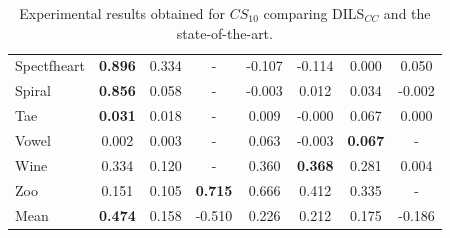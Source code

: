 \documentclass[review]{elsarticle}
\begin{document}
\begin{table}[!h]
{\begin{tabular}{lccccccc}
			Spectfheart & \textbf{0.896} & 0.334 & - & -0.107 & -0.114 & 0.000 & 0.050 \\
			Spiral & \textbf{0.856} & 0.058 & - & -0.003 & 0.012 & 0.034 & -0.002 \\
			Tae & \textbf{0.031} & 0.018 & - & 0.009 & -0.000 & 0.067 & 0.000 \\
			Vowel & 0.002 & 0.003 & - & 0.063 & -0.003 & \textbf{0.067} & - \\
			Wine & 0.334 & 0.120 & - & 0.360 & \textbf{0.368} & 0.281 & 0.004 \\
			Zoo & 0.151 & 0.105 & \textbf{0.715} & 0.666 & 0.412 & 0.335 & - \\
			\hline
			Mean & \textbf{0.474} & 0.158 & -0.510 & 0.226 & 0.212 & 0.175 & -0.186 \\
			\hline
			
		\end{tabular}}
		
	\caption{Experimental results obtained for $CS_{10}$ comparing DILS$_{CC}$ and the state-of-the-art.}
	\label{tab:results10}
\end{table}
\end{document}
